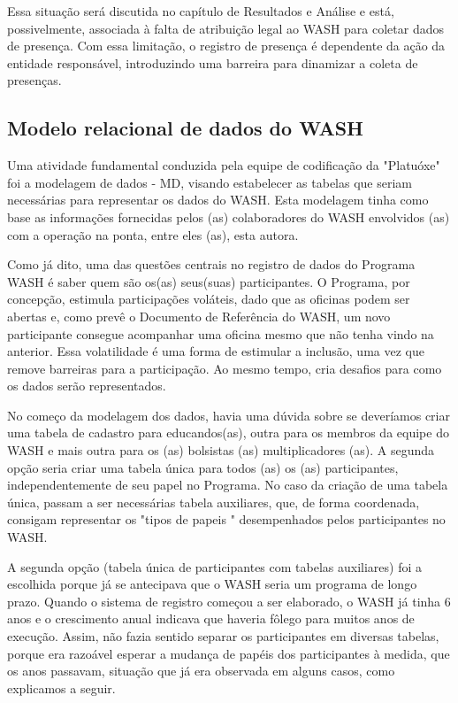 \noindent\begin{center}\mbox{\centering{}}\end{center}


Essa situação será discutida no capítulo de Resultados e Análise e está, possivelmente, associada à falta de atribuição legal ao WASH para coletar dados de presença. Com essa limitação, o registro de presença é dependente da ação da entidade responsável, introduzindo uma barreira para dinamizar a coleta de presenças.

\subsection[Modelo relacional de dados do WASH]{Modelo relacional de dados do WASH}\label{Modelo relacional de dados do WASH}
Uma atividade fundamental conduzida pela equipe de codificação da "Platuóxe" foi a modelagem de dados - MD, visando estabelecer as tabelas que seriam necessárias para representar os dados do WASH. Esta modelagem tinha como base as informações fornecidas pelos (as) colaboradores do WASH envolvidos (as) com a operação na ponta, entre eles (as), esta autora.

Como já dito, uma das questões centrais no registro de dados do Programa WASH é saber quem são os(as) seus(suas) participantes. O Programa, por concepção, estimula participações voláteis, dado que as oficinas podem ser abertas e, como prevê o Documento de Referência do WASH, um novo participante consegue acompanhar uma oficina mesmo que não tenha vindo na anterior. Essa volatilidade é uma forma de estimular a inclusão, uma vez que remove barreiras para a participação. Ao mesmo tempo, cria desafios para como os dados serão representados.

No começo da modelagem dos dados, havia uma dúvida sobre se deveríamos criar uma tabela de cadastro para educandos(as), outra para os membros da equipe do WASH e mais outra para os (as) bolsistas (as) multiplicadores (as). A segunda opção seria criar uma tabela única para todos (as) os (as) participantes, independentemente de seu papel no Programa. No caso da criação de uma tabela única, passam a ser necessárias tabela auxiliares, que, de forma coordenada, consigam representar os "tipos de papeis "  desempenhados pelos participantes no WASH.

A segunda opção (tabela única de participantes com tabelas auxiliares) foi a escolhida porque já se antecipava que o WASH seria um programa de longo prazo. Quando o sistema de registro começou a ser elaborado, o WASH já tinha 6 anos e o crescimento anual indicava que haveria fôlego para muitos anos de execução. Assim, não fazia sentido separar os participantes em diversas tabelas, porque era razoável esperar a mudança de papéis dos participantes à medida, que os anos passavam, situação que já era observada em alguns casos, como explicamos a seguir.

